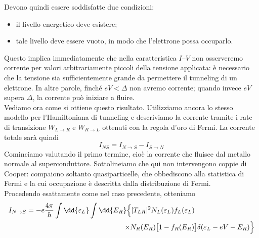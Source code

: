 Devono quindi essere soddisfatte due condizioni:
\begin{itemize}[leftmargin=0.5cm]
    \item il livello energetico deve esistere;
    \item tale livello deve essere vuoto, in modo che l'elettrone possa occuparlo.
\end{itemize}
Questo implica immediatamente che nella caratteristica $I$--$V$ non osserveremo corrente per valori arbitrariamente piccoli della tensione applicata: è necessario che la tensione sia sufficientemente grande da permettere il tunneling di un elettrone. In altre parole, finché $eV<\Delta$ non avremo corrente; quando invece $eV$ supera $\Delta$, la corrente può iniziare a fluire.\\
Vediamo ora come si ottiene questo risultato. Utilizziamo ancora lo stesso modello per l'Hamiltoniana di tunneling e descriviamo la corrente tramite i rate di transizione $W_{L \to R}$ e $W_{R \to L}$ ottenuti con la regola d'oro di Fermi. La corrente totale sarà quindi
\begin{equation*}
    I_{NS}
    =
    I_{N \to S}
    -
    I_{S \to N}
\end{equation*}
Cominciamo valutando il primo termine, cioè la corrente che fluisce dal metallo normale al superconduttore. Sottolineiamo che qui non intervengono coppie di Cooper: compaiono soltanto quasiparticelle, che obbediscono alla statistica di Fermi e la cui occupazione è descritta dalla distribuzione di Fermi.\\
Procedendo esattamente come nel caso precedente, otteniamo
\begin{equation*}
    \begin{split}
        I_{N \to S}
        &=
        -e
        \frac{4\pi}{\hbar}
        \int
        \dd{\varepsilon_L}
        \int
        \dd{E_R}
        \Bigl\{
            |T_{LR}|^2
            N_L(\varepsilon_L)
            f_L(\varepsilon_L)
        \Bigr.
        \\
        & \hphantom{=
        -e
        \frac{4\pi}{\hbar}
        \int
        \dd{\varepsilon_L}
        \int
        \dd{E_R}}
        \Bigl.
        \times
        N_R(E_R)
        \bigl[
            1-f_R(E_R)
        \bigr]
        \delta(
            \varepsilon_L-eV-E_R
        )
        \Bigr\}
    \end{split}
\end{equation*}
